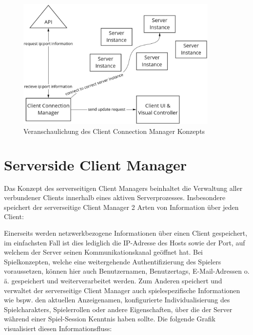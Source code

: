 \begin{figure}[H]
	\centering
	\includegraphics[width=100mm]{images/Client_Connection_Manager.jpg}
	\caption[Client Connection Manager Diagramm]{Veranschaulichung des Client Connection Manager Konzepts}
	\label{pic:Client_Connection_Manager}
\end{figure}

\section{Serverside Client Manager}

\label{serverside_client_manager}

Das Konzept des serverseitigen Client Managers beinhaltet die Verwaltung aller verbundener Clients innerhalb eines aktiven Serverprozesses. Insbesondere speichert der serverseitige Client Manager 2 Arten von Information über jeden Client:

Einerseits werden netzwerkbezogene Informationen über einen Client gespeichert, im einfachsten Fall ist dies lediglich die IP-Adresse des Hosts sowie der Port, auf welchem der Server seinen Kommunikationskanal geöffnet hat. Bei Spielkonzepten, welche eine weitergehende Authentifizierung des Spielers voraussetzen, können hier auch Benutzernamen, Benutzertags, E-Mail-Adressen o. ä. gespeichert und weiterverarbeitet werden. Zum Anderen speichert und verwaltet der serverseitige Client Manager auch spielespezifische Informationen wie bspw. den aktuellen Anzeigenamen, konfigurierte Individualisierung des Spielcharakters, Spielerrollen oder andere Eigenschaften, über die der Server während einer Spiel-Session Kenntnis haben sollte. Die folgende Grafik visualisiert diesen Informationsfluss:

